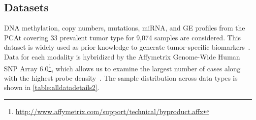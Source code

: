 \subsection{Datasets}
DNA methylation, copy numbers, mutations, miRNA, and GE profiles from the PCAt covering 33 prevalent tumor type for 9,074 samples are considered. This dataset is widely used as prior knowledge to generate tumor-specific biomarkers~\cite{way2018machine,hoadley2018cell,malta2018machine}. Data for each modality is hybridized by the Affymetrix Genome-Wide Human SNP Array 6.0\footnote{\url{http://www.affymetrix.com/support/technical/byproduct.affx}}, which allows us to examine the largest number of cases along with the highest probe density~\cite{31Park}. 
The sample distribution across data types is shown in \cref{table:alldatadetails2}. %



